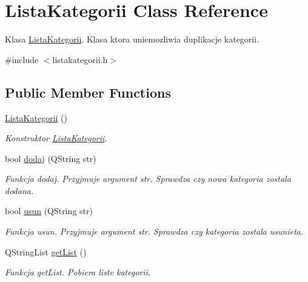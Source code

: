 \hypertarget{class_lista_kategorii}{}\section{Lista\+Kategorii Class Reference}
\label{class_lista_kategorii}


Klasa \hyperlink{class_lista_kategorii}{Lista\+Kategorii}. Klasa ktora uniemozliwia duplikacje kategorii.  




{\ttfamily \#include $<$listakategorii.\+h$>$}

\subsection*{Public Member Functions}
\begin{DoxyCompactItemize}
\item 
\hypertarget{class_lista_kategorii_acef65dde16520b6ff29ccba87c2e1165}{}\hyperlink{class_lista_kategorii_acef65dde16520b6ff29ccba87c2e1165}{Lista\+Kategorii} ()\label{class_lista_kategorii_acef65dde16520b6ff29ccba87c2e1165}

\begin{DoxyCompactList}\small\item\em Konstruktor \hyperlink{class_lista_kategorii}{Lista\+Kategorii}. \end{DoxyCompactList}\item 
bool \hyperlink{class_lista_kategorii_a76d076d87408f34c36fd4e2c56d010e1}{dodaj} (Q\+String str)
\begin{DoxyCompactList}\small\item\em Funkcja dodaj. Przyjmuje argument str. Sprawdza czy nowa kategoria zostala dodana. \end{DoxyCompactList}\item 
bool \hyperlink{class_lista_kategorii_a1ae1a558622fb75c33f22e1e897c0ac4}{usun} (Q\+String str)
\begin{DoxyCompactList}\small\item\em Funkcja usun. Przyjmuje argument str. Sprawdza czy kategoria zostala usunieta. \end{DoxyCompactList}\item 
Q\+String\+List \hyperlink{class_lista_kategorii_a82324bbd533f8e6395afc0b3e4babef8}{get\+List} ()
\begin{DoxyCompactList}\small\item\em Funkcja get\+List. Pobiera liste kategorii. \end{DoxyCompactList}\end{DoxyCompactItemize}



